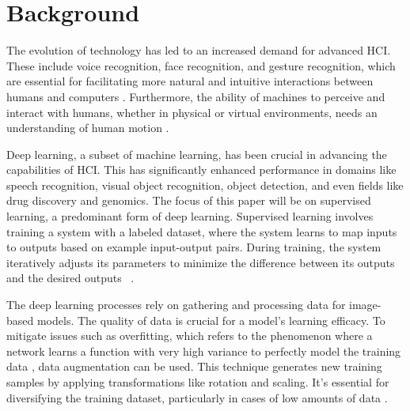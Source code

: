 \documentclass[runningheads]{llncs}
\begin{document}
\section{Background}
\label{sec:background}

The evolution of technology has led to an increased demand for advanced HCI. These include voice recognition, face recognition, and gesture recognition, which are essential for facilitating more natural and intuitive interactions between humans and computers \cite{Alrowais2023}. Furthermore, the ability of machines to perceive and interact with humans, whether in physical or virtual environments, needs an understanding of human motion \cite{Martinez2017}.

Deep learning, a subset of machine learning, has been crucial in advancing the capabilities of HCI. This has significantly enhanced performance in domains like speech recognition, visual object recognition, object detection, and even fields like drug discovery and genomics. The focus of this paper will be on supervised learning, a predominant form of deep learning. Supervised learning involves training a system with a labeled dataset, where the system learns to map inputs to outputs based on example input-output pairs. During training, the system iteratively adjusts its parameters to minimize the difference between its outputs and the desired outputs \cite{Lecun2015}~\cite{Mahony2020}.



The deep learning processes rely on gathering and processing data for image-based models. The quality of data is crucial for a model's learning efficacy. To mitigate issues such as overfitting, which refers to the phenomenon where a network learns a function with very high variance to perfectly model the training data \cite{Shorten2019}, data augmentation can be used. This technique generates new training samples by applying transformations like rotation and scaling. It's essential for diversifying the training dataset, particularly in cases of low amounts of data \cite{Khalifa2022}.
\end{document}
